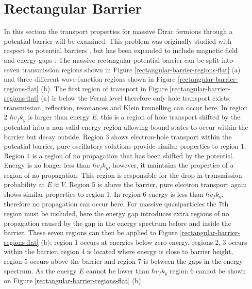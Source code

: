 \documentclass[12pt,a4paper]{report}
\begin{document}
\chapter{Rectangular Barrier}
\label{Rectangular Barrier}
	In this section the transport properties for massive Dirac fermions through a potential barrier will be examined. This problem was originally studied with respect to potential barriers \cite{b12}, but has been expanded to include magnetic field \cite{b14} and energy gaps \cite{b4,b13,b15,b16,b17}. The massive rectangular potential barrier can be split into seven transmission regions shown in Figure \ref{rectangular-barrier-regions-flat} (a) and three different wave-function regions shown in Figure \ref{rectangular-barrier-regions-flat} (b). The first region of transport in Figure \ref{rectangular-barrier-regions-flat} (a) is below the Fermi level therefore only hole transport exists; transmission, reflection, resonances and Klein tunnelling can occur here. In region 2 $\hbar v_{f}k_{y}$ is larger than energy $E$, this is a region of hole transport shifted by the potential into a non-valid energy region allowing bound states to occur within the barrier but decay outside. Region 3 shows electron-hole transport within the potential barrier, pure oscillatory solutions provide similar properties to region 1. Region 4 is a region of no propagation that has been shifted by the potential. Energy is no longer less than $\hbar v_{f}k_{y}$, however, it maintains the properties of a region of no propagation. This region is responsible for the drop in transmission probability at $E\approx V$. Region 5 is above the barrier, pure electron transport again shows similar properties to region 1. In region 6 energy is less than $\hbar v_{f}k_{y}$, therefore no propagation can occur here. For massive quasiparticles the 7th region must be included, here the energy gap introduces extra regions of no propagation caused by the gap in the energy spectrum before and inside the barrier. These seven regions can then be applied to Figure \ref{rectangular-barrier-regions-flat} (b); region 1 occurs at energies below zero energy, regions 2, 3 occurs within the barrier, region 4 is  located where energy is close to barrier height, region 5 occurs above the barrier and region 7 is between the gaps in the energy spectrum. As the energy $E$ cannot be lower than $\hbar v_{f}k_{y}$ region 6 cannot be shown on Figure \ref{rectangular-barrier-regions-flat} (b).
\end{document}
